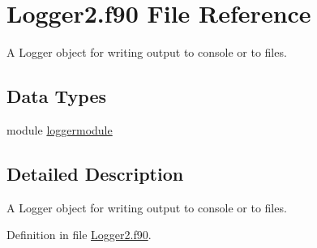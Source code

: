 \hypertarget{Logger2_8f90}{\section{Logger2.\+f90 File Reference}
\label{Logger2_8f90}
}


A Logger object for writing output to console or to files.  


\subsection*{Data Types}
\begin{DoxyCompactItemize}
\item 
module \hyperlink{classloggermodule}{loggermodule}
\end{DoxyCompactItemize}


\subsection{Detailed Description}
A Logger object for writing output to console or to files. 



Definition in file \hyperlink{Logger2_8f90_source}{Logger2.\+f90}.

